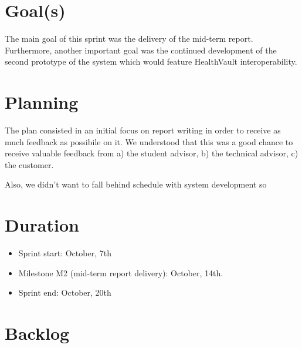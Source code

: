 \section{Goal(s)}

The main goal of this sprint was the delivery of the mid-term report.
Furthermore, another important goal was the continued development of the second prototype
of the system which would feature HealthVault interoperability.

\section{Planning}

The plan consisted in an initial focus on report writing in order to receive as much
feedback as possibile on it. We understood that this was a good chance to receive
valuable feedback from a) the student advisor, b) the technical advisor, c) the customer.

Also, we didn't want to fall behind schedule with system development so 


\section{Duration}

\begin{itemize}
\item Sprint start:  October, 7th
\item Milestone M2 (mid-term report delivery): October, 14th.
\item Sprint end: October, 20th
\end{itemize}

\section{Backlog}



